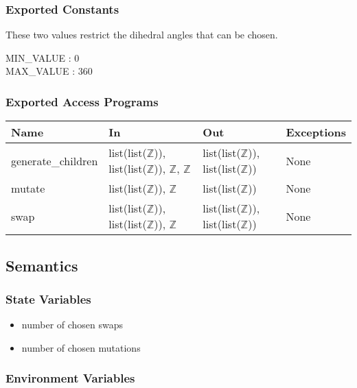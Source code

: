 \documentclass[12pt, titlepage]{article}
\begin{document}
\subsubsection{Exported Constants}

These two values restrict the dihedral angles that can be chosen.

MIN\_VALUE : 0\\
\indent MAX\_VALUE : 360

\subsubsection{Exported Access Programs}

\begin{center}
	\begin{tabular}{p{3.5cm} p{4cm} p{3cm} p{2cm}}
		\hline
		\textbf{Name} & \textbf{In} & \textbf{Out} & \textbf{Exceptions} \\
		\hline
		generate\_children & list(list($\mathbb{Z}$)), 
		list(list($\mathbb{Z}$)), $\mathbb{Z}$, $\mathbb{Z}$ & 
		list(list($\mathbb{Z}$)), list(list($\mathbb{Z}$)) & None \\
		mutate & list(list($\mathbb{Z}$)), $\mathbb{Z}$ & 
		list(list($\mathbb{Z}$)) & None \\
		swap & list(list($\mathbb{Z}$)), 
		list(list($\mathbb{Z}$)), $\mathbb{Z}$ & list(list($\mathbb{Z}$)), 
		list(list($\mathbb{Z}$)) & None \\
		\hline
	\end{tabular}
\end{center}

\subsection{Semantics}

\subsubsection{State Variables}

\begin{itemize}
	\item number of chosen swaps
	\item number of chosen mutations
\end{itemize}

\subsubsection{Environment Variables}
\end{document}
